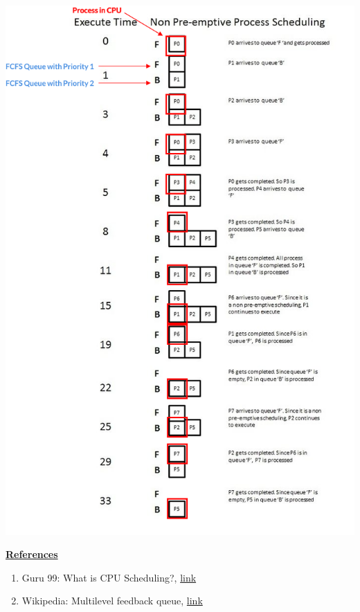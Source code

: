 \documentclass[12pt]{article}
\begin{document}
\begin{itemize}
    \begin{center}
    \includegraphics[width=0.8\linewidth]{images/week_4_notes_1_5.png}
    \end{center}

    \bigskip

    \underline{\textbf{References}}

    \begin{enumerate}[1)]
        \item Guru 99: What is CPU Scheduling?, \href{https://www.guru99.com/cpu-scheduling-algorithms.html#8}{link}
        \item Wikipedia: Multilevel feedback queue, \href{https://en.wikipedia.org/wiki/Multilevel_feedback_queue}{link}
    \end{enumerate}


\end{itemize}
\end{document}
